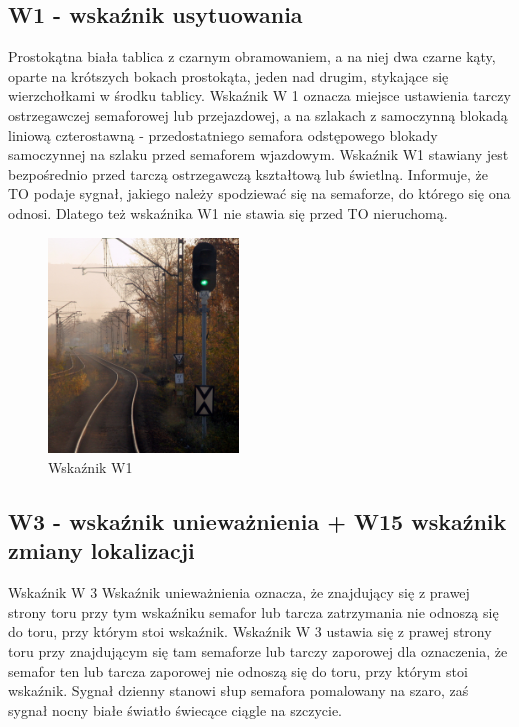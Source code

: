 \subsection{W1 - wskaźnik usytuowania}

Prostokątna biała tablica z czarnym obramowaniem, a na niej dwa czarne kąty, oparte na krótszych bokach prostokąta, jeden nad drugim, stykające się wierzchołkami w środku tablicy. Wskaźnik W 1 oznacza miejsce ustawienia tarczy ostrzegawczej semaforowej lub przejazdowej, a na szlakach z samoczynną blokadą liniową czterostawną - przedostatniego
semafora odstępowego blokady samoczynnej na szlaku przed semaforem wjazdowym. Wskaźnik W1 stawiany jest bezpośrednio przed tarczą ostrzegawczą kształtową lub świetlną. Informuje, że TO podaje sygnał, jakiego należy spodziewać się na semaforze, do którego się ona odnosi. Dlatego też wskaźnika W1 nie stawia się przed TO nieruchomą.

	\begin{figure}
		\includegraphics[width=0.45\textwidth]{skryptkierownik-img/skryptkierownik-img004.jpg}
		\caption{Wskaźnik W1}
	\end{figure}

\subsection{W3 - wskaźnik unieważnienia + W15 wskaźnik zmiany lokalizacji}

Wskaźnik W 3 {\textquotedbl}Wskaźnik unieważnienia{\textquotedbl} oznacza, że znajdujący się z prawej strony toru przy
tym wskaźniku semafor lub tarcza zatrzymania nie odnoszą się do toru, przy którym stoi wskaźnik. Wskaźnik W 3 ustawia
się z prawej strony toru przy znajdującym się tam semaforze lub tarczy zaporowej dla oznaczenia, że semafor ten lub
tarcza zaporowej nie odnoszą się do toru, przy którym stoi wskaźnik. Sygnał dzienny stanowi słup semafora pomalowany na
szaro, zaś sygnał nocny białe światło świecące ciągle na szczycie.

